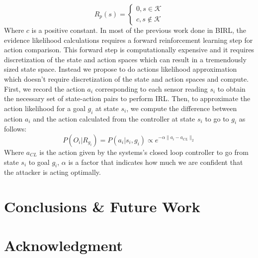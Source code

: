 \documentclass[conference]{IEEEtran}
\begin{document}
  \[
    R_p(s)=\left\{
                \begin{array}{ll}
                  0, s\in \mathcal{K}\\
                  c, s\notin \mathcal{K}
                \end{array}
              \right.
  \]
Where $c$ is a positive constant.
In most of the previous work done in BIRL, the evidence likelihood calculations requires a forward reinforcement learning step for action comparison. This forward step is computationally expensive and it requires discretization of the state and action spaces which can result in a tremendously sized state space. Instead we propose to do actions likelihood approximation which doesn't require discretization of the state and action spaces and compute. First, we record the action $a_i$ corresponding to each sensor reading $s_i$ to obtain the necessary set of state-action pairs to perform IRL. Then, to approximate the action likelihood for a goal $g_i$ at state $s_i$, we compute the difference between action $a_i$ and the action calculated from the controller at state $s_i$ to go to $g_i$ as follows:
\[
P(O_i|R_{g_i}) = P(a_i|s_i,g_i) \propto e^{-\alpha \lVert a_i - a_{CL} \rVert_{2}}
\]
Where $a_{CL}$ is the action given by the systems's closed loop controller to go from state $s_i$ to goal $g_i$, $\alpha$ is a factor that indicates how much we are confident that the attacker is acting optimally.
\section{Conclusions \& Future Work}\label{sec:conclusion}




\section*{Acknowledgment}







%
%
%




\end{document}
